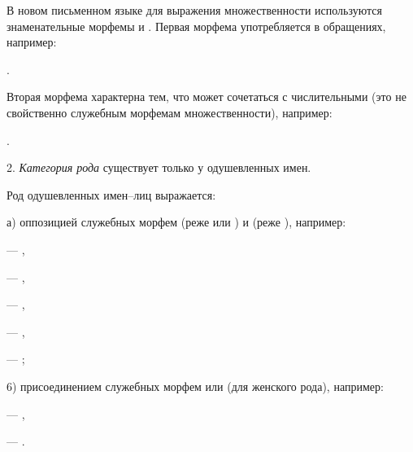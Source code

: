 В новом письменном языке для выражения множественности используются знаменательные морфемы  и .
Первая морфема употребляется в обращениях, например:
\begin{prfsample}
    \item {}.    
\end{prfsample}
Вторая морфема характерна тем, что может сочетаться с числительными (это не свойственно служебным морфемам множественности), например:
\begin{prfsample}
    \item {}.
\end{prfsample}

2. \emph{Категория рода} существует только у одушевленных имен.

Род одушевленных имен--лиц выражается:

а) оппозицией служебных морфем  (реже  или ) и  (реже ), например:
\begin{prfsample}
    \item {} --- ,
    \item {} --- ,
    \item {} --- ,
    \item {} --- ,
    \item {} --- ;
\end{prfsample}

6) присоединением служебных морфем  или  (для женского рода), например:
\begin{prfsample}
    \item {} --- ,
    \item {} --- .
\end{prfsample}

